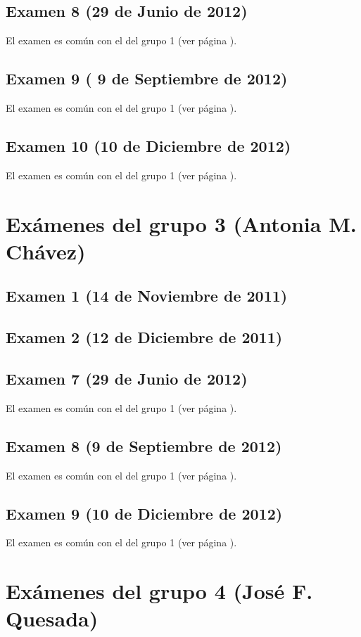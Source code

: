 \documentclass[a4paper,12pt,twoside]{book}
\begin{document}
\subsection{Examen 8 (29 de Junio de 2012)}
El examen es común con el del grupo 1 (ver página \pageref{examen_11_12_1_8}).
\subsection{Examen 9 ( 9 de Septiembre de 2012)}
El examen es común con el del grupo 1 (ver página \pageref{examen_11_12_1_9}).
\subsection{Examen 10 (10 de Diciembre de 2012)}
El examen es común con el del grupo 1 (ver página \pageref{examen_11_12_1_10}).

\section{Exámenes del grupo 3 (Antonia M. Chávez)}
\subsection{Examen 1 (14 de Noviembre de 2011)}
\subsection{Examen 2 (12 de Diciembre de 2011)}
\subsection{Examen 7 (29 de Junio de 2012)}
El examen es común con el del grupo 1 (ver página \pageref{examen_11_12_1_8}).
\subsection{Examen 8 (9 de Septiembre de 2012)}
El examen es común con el del grupo 1 (ver página \pageref{examen_11_12_1_9}).
\subsection{Examen 9 (10 de Diciembre de 2012)}
El examen es común con el del grupo 1 (ver página \pageref{examen_11_12_1_10}).

\section{Exámenes del grupo 4 (José F. Quesada)}
\end{document}
